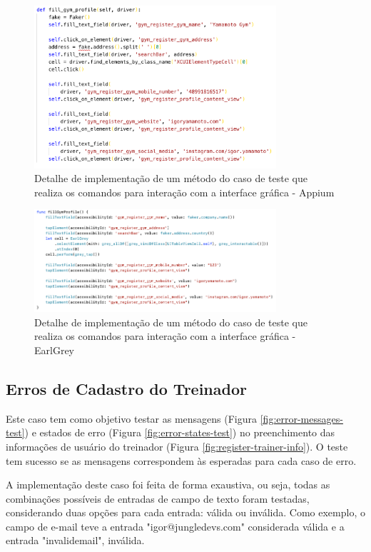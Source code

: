 \begin{figure}[H]
    \centering
    \includegraphics[width=0.8\textwidth]{pfc/figuras/fill-gym-appium.png}
    \caption{Detalhe de implementação de um método do caso de teste que realiza os comandos para interação com a interface gráfica - Appium}
    \label{fig:fill-gym-appium}
\end{figure}

\begin{figure}[H]
    \centering
    \includegraphics[width=0.8\textwidth]{pfc/figuras/fill-gym-earlgrey.png}
    \caption{Detalhe de implementação de um método do caso de teste que realiza os comandos para interação com a interface gráfica - EarlGrey}
    \label{fig:fill-gym-earlgrey}
\end{figure}

\subsection{Erros de Cadastro do Treinador}
Este caso tem como objetivo testar as mensagens (Figura \ref{fig:error-messages-test}) e estados de erro (Figura \ref{fig:error-states-test}) no preenchimento das informações de usuário do treinador (Figura \ref{fig:register-trainer-info}). O teste tem sucesso se as mensagens correspondem às esperadas para cada caso de erro.

A implementação deste caso foi feita de forma exaustiva, ou seja, todas as combinações possíveis de entradas de campo de texto foram testadas, considerando duas opções para cada entrada: válida ou inválida. Como exemplo, o campo de e-mail teve a entrada "igor@jungledevs.com" considerada válida e a entrada "invalidemail", inválida.

